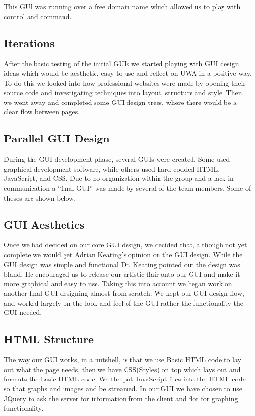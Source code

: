 This GUI was running over a free domain name which allowed us to play with control and command. 

\subsection{Iterations}

After the basic testing of the initial GUIs we started playing with GUI design ideas which would be aesthetic, easy to use and reflect on UWA in a positive way.  To do this we looked into how professional websites were made by opening their source code and investigating techniques into layout, structure and style. Then we went away and completed some GUI design trees, where there would be a clear flow between pages.  

\subsection{Parallel GUI Design}

During the GUI development phase, several GUIs were created. Some used graphical development software, while others used hard codded HTML, JavaScript, and CSS.  Due to no organization within the group and a lack in communication a ``final GUI'' was made by several of the team members.  Some of theses are shown below.

\subsection{GUI Aesthetics}

Once we had decided on our core GUI design, we decided that, although not yet complete we would get Adrian Keating's opinion on the GUI design. While the GUI design was simple and functional Dr. Keating pointed out the design was bland. He encouraged us to release our artistic flair onto our GUI and make it more graphical and easy to use. Taking this into account we began work on another final GUI designing almost from scratch. We kept our GUI design flow, and worked largely on the look and feel of the GUI rather the functionality the GUI needed. 

\subsection{HTML Structure}

The way our GUI works, in a nutshell, is that we use Basic HTML code to lay out what the page needs, then we have CSS(Styles) on top which lays out and formats the basic HTML code. We the put JavaScript files into the HTML code so that graphs and images and be streamed. In our GUI we have chosen to use JQuery to ask the server for information from the client and flot for graphing functionality. 

